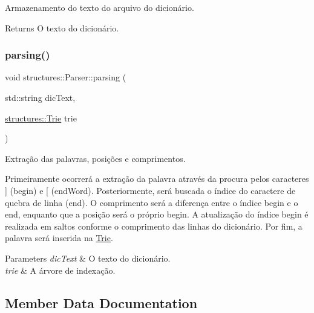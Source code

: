 Armazenamento do texto do arquivo do dicionário. 

\begin{DoxyReturn}{Returns}
O texto do dicionário. 
\end{DoxyReturn}
\mbox{\label{classstructures_1_1Parser_a4cab45335029ece42ba0d79263621ace}} 
\subsubsection{\texorpdfstring{parsing()}{parsing()}}
{\footnotesize\ttfamily void structures\+::\+Parser\+::parsing (\begin{DoxyParamCaption}\item[{std\+::string}]{dic\+Text,  }\item[{\hyperlink{classstructures_1_1Trie}{structures\+::\+Trie}}]{trie }\end{DoxyParamCaption})\hspace{0.3cm}{\ttfamily [inline]}}



Extração das palavras, posições e comprimentos. 

Primeiramente ocorrerá a extração da palavra através da procura pelos caracteres \textquotesingle{}\mbox{]}\textquotesingle{} (begin) e \textquotesingle{}\mbox{[}\textquotesingle{} (end\+Word). Posteriormente, será buscada o índice do caractere de quebra de linha (end). O comprimento será a diferença entre o índice begin e o end, enquanto que a posição será o próprio begin. A atualização do índice begin é realizada em saltos conforme o comprimento das linhas do dicionário. Por fim, a palavra será inserida na \hyperlink{classstructures_1_1Trie}{Trie}.


\begin{DoxyParams}{Parameters}
{\em dic\+Text} & O texto do dicionário. \\
\hline
{\em trie} & A árvore de indexação. \\
\hline
\end{DoxyParams}


\subsection{Member Data Documentation}
\mbox{\label{classstructures_1_1Parser_ac5ccd294f3176bcac3f1de2045e523ef}} 
